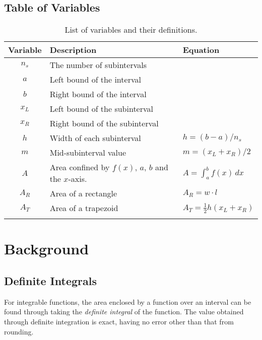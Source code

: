 \documentclass{paper}
\begin{document}
\subsection{Table of Variables}
\renewcommand{\arraystretch}{1.1}
\begin{table}[ht]
    \centering
    \begin{tabular}{cll}
            \dtoprule
            \textbf{Variable}   &   \textbf{Description}            &   \textbf{Equation}       \\
            \hline
            \(n_s\)             &   The number of subintervals      &                           \\
            \(a\)               &   Left bound of the interval      &                           \\
            \(b\)               &   Right bound of the interval     &                           \\
            \(x_L\)             &   Left bound of the subinterval   &                           \\
            \(x_R\)             &   Right bound of the subinterval  &                           \\
            \(h\)               &   Width of each subinterval       &   \(h=(b-a)/n_s\)         \\
            \(m\)               &   Mid-subinterval value           &   \(m=(x_L+x_R)/2\)       \\
            \(A\)               &   Area confined by \(f(x)\), \(a\), \(b\) and the \(x\)-axis. & \(A=\int_a^b f(x) \, dx\) \\
            \(A_R\)             &   Area of a rectangle             &   \(A_R=w \cdot l\)       \\
            \(A_T\)             &   Area of a trapezoid             &   \(A_T=\frac{1}{2} h (x_L + x_R)\)  \\
            \dbottomrule
    \end{tabular}
    \caption{List of variables and their definitions.}
    \label{table:variables}
\end{table}

\section{Background}
\label{sec:background}
\subsection{Definite Integrals}
\label{sec:definite}
For integrable functions, the area enclosed by a function over an interval can be found through taking the \emph{definite integral} of the function.
The value obtained through definite integration is exact, having no error other than that from rounding.
\end{document}
